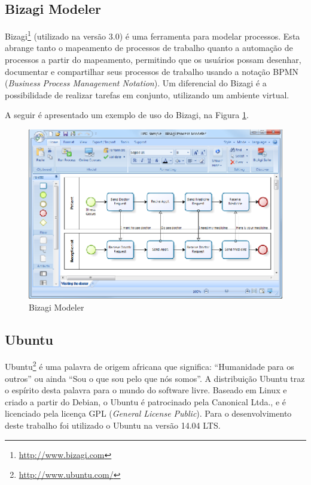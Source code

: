 \subsection{Bizagi Modeler}

Bizagi\footnote{\url{http://www.bizagi.com}} (utilizado na versão 3.0) é uma ferramenta para modelar processos. Esta abrange tanto o mapeamento de processos de trabalho quanto a automação de processos a partir do mapeamento, permitindo que os usuários possam desenhar, documentar e compartilhar seus processos de trabalho usando a notação BPMN (\textit{Business Process Management Notation}). Um diferencial do Bizagi é a possibilidade de realizar tarefas em conjunto, utilizando um ambiente virtual.

A seguir é apresentado um exemplo de uso do Bizagi, na Figura \ref{bizagi}.

\begin{figure}[!h]
	\centering
	\includegraphics[scale=1.5]{figuras/suporte_tecnologico/bizagi.eps}
	\caption{Bizagi Modeler}
	\label{bizagi}
\end{figure}

\subsection{Ubuntu}

Ubuntu\footnote{\url{http://www.ubuntu.com/}} é uma palavra de origem africana que significa: ``Humanidade para os outros'' ou ainda ``Sou o que sou pelo que nós somos''. A distribuição Ubuntu traz o espírito desta palavra para o mundo do software livre. Baseado em Linux e criado a partir do Debian, o Ubuntu é patrocinado pela Canonical Ltda., e é licenciado pela licença GPL (\textit{General License Public}). Para o desenvolvimento deste trabalho foi utilizado o Ubuntu na versão 14.04 LTS.

